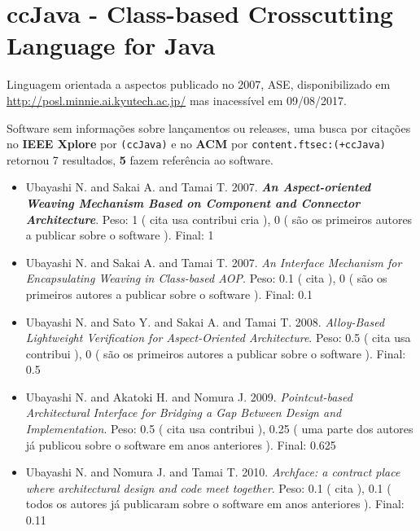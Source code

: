 \section{ccJava - Class-based Crosscutting Language for Java}

Linguagem orientada a aspectos
publicado no 2007, ASE,
disponibilizado em \url{http://posl.minnie.ai.kyutech.ac.jp/}
mas inacessível em 09/08/2017.

Software sem informações sobre lançamentos ou releases,
uma busca por citações no {\bf IEEE Xplore} por
\texttt{(ccJava)}
e no {\bf ACM} por
\texttt{content.ftsec:(+ccJava)}
retornou
7 resultados,
{\bf 5} fazem referência ao software.

\begin{itemize}
\item Ubayashi N. and Sakai A. and Tamai T.
      2007.
        \textbf{\textit{ An Aspect-oriented Weaving Mechanism Based on Component and Connector Architecture}}.
      Peso:
      1 (
          cita
          usa
          contribui
          cria
      ),
      0 (
são os primeiros autores a publicar sobre o software
      ).
      Final:
      1

\item Ubayashi N. and Sakai A. and Tamai T.
      2007.
        \textit{ An Interface Mechanism for Encapsulating Weaving in Class-based AOP}.
      Peso:
      0.1 (
          cita
      ),
      0 (
são os primeiros autores a publicar sobre o software
      ).
      Final:
      0.1

\item Ubayashi N. and Sato Y. and Sakai A. and Tamai T.
      2008.
        \textit{ Alloy-Based Lightweight Verification for Aspect-Oriented Architecture}.
      Peso:
      0.5 (
          cita
          usa
          contribui
      ),
      0 (
são os primeiros autores a publicar sobre o software
      ).
      Final:
      0.5

\item Ubayashi N. and Akatoki H. and Nomura J.
      2009.
        \textit{ Pointcut-based Architectural Interface for Bridging a Gap Between Design and Implementation}.
      Peso:
      0.5 (
          cita
          usa
          contribui
      ),
      0.25 (
uma parte dos autores já publicou sobre o software em anos anteriores
      ).
      Final:
      0.625

\item Ubayashi N. and Nomura J. and Tamai T.
      2010.
        \textit{ Archface: a contract place where architectural design and code meet together}.
      Peso:
      0.1 (
          cita
      ),
      0.1 (
todos os autores já publicaram sobre o software em anos anteriores
      ).
      Final:
      0.11

\end{itemize}

